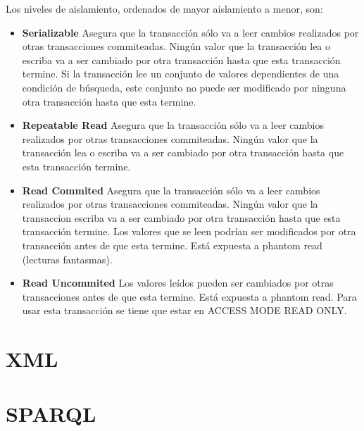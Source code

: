 \documentclass[11pt,letterpaper]{article}
\begin{document}
Los niveles de aislamiento, ordenados de mayor aislamiento a menor, son:
\begin{itemize}
	\item \textbf{Serializable} Asegura que la transacción sólo va a leer cambios realizados por otras transacciones commiteadas. Ningún valor que la transacción lea o escriba va a ser cambiado por otra transacción hasta que esta transacción termine. Si la transacción lee un conjunto de valores dependientes de una condición de búsqueda, este conjunto no puede ser modificado por ninguna otra transacción hasta que esta termine.
	\item \textbf{Repeatable Read} Asegura que la transacción sólo va a leer cambios realizados por otras transacciones commiteadas. Ningún valor que la transacción lea o escriba va a ser cambiado por otra transacción hasta que esta transacción termine.
	\item \textbf{Read Commited} Asegura que la transacción sólo va a leer cambios realizados por otras transacciones commiteadas. Ningún valor que la transaccion escriba va a ser cambiado por otra transacción hasta que esta transacción termine. Los valores que se leen podrían ser modificados por otra transacción antes de que esta termine. Está expuesta a phantom read (lecturas fantasmas).
	\item \textbf{Read Uncommited} Los valores leídos pueden ser cambiados por otras transacciones antes de que esta termine. Está expuesta a phantom read. Para usar esta transacción se tiene que estar en ACCESS MODE READ ONLY.
\end{itemize}
\section{XML}

\section{SPARQL}


\end{document}
